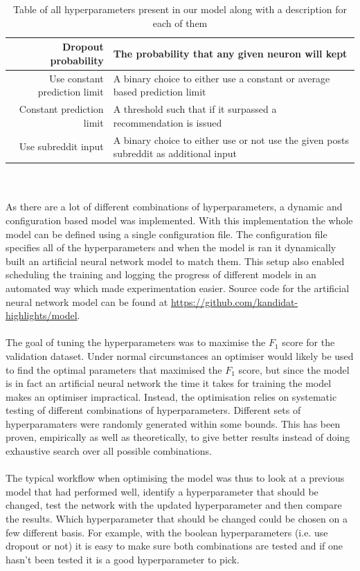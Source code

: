 \begin{table}[h!]
\begin{tabular}{ r  p{7cm} }
        Dropout probability & The probability that any given neuron will kept \\ \hline
        Use constant prediction limit & A binary choice to either use a constant or average based prediction limit \\ \hline
        Constant prediction limit & A threshold such that if it surpassed a recommendation is issued  \\ \hline
        Use subreddit input & A binary choice to either use or not use the given posts subreddit as additional input \\ \hline
    \end{tabular}
    \caption{Table of all hyperparameters present in our model along with a description for each of them}
    \label{table:hyperparameters}
\end{table}
\\\\
As there are a lot of different combinations of hyperparameters, a dynamic and configuration based model was implemented. With this implementation the whole model can be defined using a single configuration file. The configuration file specifies all of the hyperparameters and when the model is ran it dynamically built an artificial neural network model to match them. This setup also enabled scheduling the training and logging the progress of different models in an automated way which made experimentation easier. Source code for the artificial neural network model can be found at \url{https://github.com/kandidat-highlights/model}.
\\\\
The goal of tuning the hyperparameters was to maximise the $F_1$ score for the validation dataset. Under normal circumstances an optimiser would likely be used to find the optimal parameters that maximised the $F_1$ score, but since the model is in fact an artificial neural network the time it takes for training the model makes an optimiser impractical. Instead, the optimisation relies on systematic testing of different combinations of hyperparameters. Different sets of hyperparamaters were randomly generated within some bounds. This has been proven, empirically as well as theoretically, to give better results instead of doing exhaustive search over all possible combinations. \parencite{bergstra2012random}
\\\\
The typical workflow when optimising the model was thus to look at a previous model that had performed well, identify a hyperparameter that should be changed, test the network with the updated hyperparameter and then compare the results. Which hyperparameter that should be changed could be chosen on a few different basis. For example, with the boolean hyperparameters (i.e. use dropout or not) it is easy to make sure both combinations are tested and if one hasn't been tested it is a good hyperparameter to pick.
